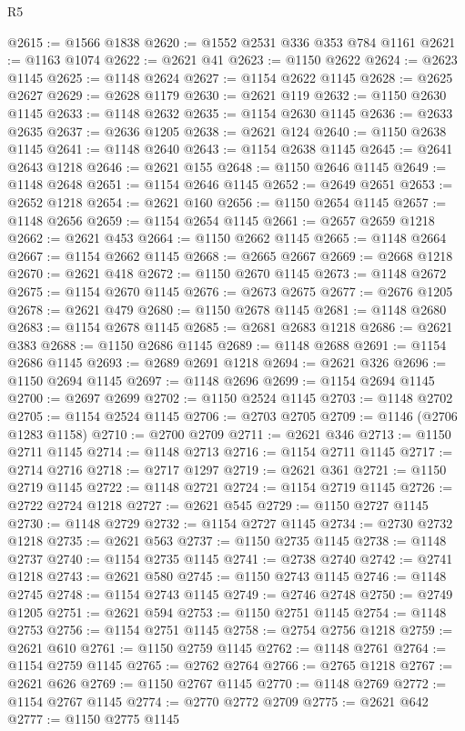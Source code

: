\begin{lexlean}{R5}
\begin{coremodule}
@2615 := @1566 @1838
@2620 := @1552 @2531 @336 @353 @784 @1161
@2621 := @1163 @1074
@2622 := @2621 @41
@2623 := @1150 @2622
@2624 := @2623 @1145
@2625 := @1148 @2624
@2627 := @1154 @2622 @1145
@2628 := @2625 @2627
@2629 := @2628 @1179
@2630 := @2621 @119
@2632 := @1150 @2630 @1145
@2633 := @1148 @2632
@2635 := @1154 @2630 @1145
@2636 := @2633 @2635
@2637 := @2636 @1205
@2638 := @2621 @124
@2640 := @1150 @2638 @1145
@2641 := @1148 @2640
@2643 := @1154 @2638 @1145
@2645 := @2641 @2643 @1218
@2646 := @2621 @155
@2648 := @1150 @2646 @1145
@2649 := @1148 @2648
@2651 := @1154 @2646 @1145
@2652 := @2649 @2651
@2653 := @2652 @1218
@2654 := @2621 @160
@2656 := @1150 @2654 @1145
@2657 := @1148 @2656
@2659 := @1154 @2654 @1145
@2661 := @2657 @2659 @1218
@2662 := @2621 @453
@2664 := @1150 @2662 @1145
@2665 := @1148 @2664
@2667 := @1154 @2662 @1145
@2668 := @2665 @2667
@2669 := @2668 @1218
@2670 := @2621 @418
@2672 := @1150 @2670 @1145
@2673 := @1148 @2672
@2675 := @1154 @2670 @1145
@2676 := @2673 @2675
@2677 := @2676 @1205
@2678 := @2621 @479
@2680 := @1150 @2678 @1145
@2681 := @1148 @2680
@2683 := @1154 @2678 @1145
@2685 := @2681 @2683 @1218
@2686 := @2621 @383
@2688 := @1150 @2686 @1145
@2689 := @1148 @2688
@2691 := @1154 @2686 @1145
@2693 := @2689 @2691 @1218
@2694 := @2621 @326
@2696 := @1150 @2694 @1145
@2697 := @1148 @2696
@2699 := @1154 @2694 @1145
@2700 := @2697 @2699
@2702 := @1150 @2524 @1145
@2703 := @1148 @2702
@2705 := @1154 @2524 @1145
@2706 := @2703 @2705
@2709 := @1146 (@2706 @1283 @1158)
@2710 := @2700 @2709
@2711 := @2621 @346
@2713 := @1150 @2711 @1145
@2714 := @1148 @2713
@2716 := @1154 @2711 @1145
@2717 := @2714 @2716
@2718 := @2717 @1297
@2719 := @2621 @361
@2721 := @1150 @2719 @1145
@2722 := @1148 @2721
@2724 := @1154 @2719 @1145
@2726 := @2722 @2724 @1218
@2727 := @2621 @545
@2729 := @1150 @2727 @1145
@2730 := @1148 @2729
@2732 := @1154 @2727 @1145
@2734 := @2730 @2732 @1218
@2735 := @2621 @563
@2737 := @1150 @2735 @1145
@2738 := @1148 @2737
@2740 := @1154 @2735 @1145
@2741 := @2738 @2740
@2742 := @2741 @1218
@2743 := @2621 @580
@2745 := @1150 @2743 @1145
@2746 := @1148 @2745
@2748 := @1154 @2743 @1145
@2749 := @2746 @2748
@2750 := @2749 @1205
@2751 := @2621 @594
@2753 := @1150 @2751 @1145
@2754 := @1148 @2753
@2756 := @1154 @2751 @1145
@2758 := @2754 @2756 @1218
@2759 := @2621 @610
@2761 := @1150 @2759 @1145
@2762 := @1148 @2761
@2764 := @1154 @2759 @1145
@2765 := @2762 @2764
@2766 := @2765 @1218
@2767 := @2621 @626
@2769 := @1150 @2767 @1145
@2770 := @1148 @2769
@2772 := @1154 @2767 @1145
@2774 := @2770 @2772 @2709
@2775 := @2621 @642
@2777 := @1150 @2775 @1145

\end{coremodule}
\end{lexlean}
